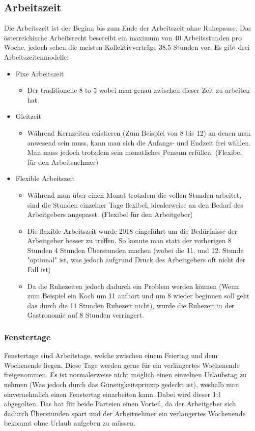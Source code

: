 \documentclass{article}
\begin{document}
	\subsection{Arbeitszeit}
	Die Arbeitszeit ist der Beginn bis zum Ende der Arbeitszeit ohne Ruhepause. Das österreichische Arbeitsrecht bescreibt ein maximum von 40 Arbeitsstunden pro Woche, jedoch sehen die meisten Kollektivverträge 38,5 Stunden vor.
	Es gibt drei Arbeitszeitenmodelle:
	\begin{itemize}
		\item{Fixe Arbeitszeit}
		\begin{itemize}
			\item{Der traditionelle 8 to 5 wobei man genau zwischen dieser Zeit zu arbeiten hat.}
		\end{itemize}
		\item{Gleitzeit}
		\begin{itemize}
			\item{Während Kernzeiten existieren (Zum Beispiel von 8 bis 12) an denen man anwesend sein muss, kann man sich die Anfangs- und Endzeit frei wählen. Man muss jedoch trotzdem sein monatliches Pensum erfüllen. (Flexibel für den Arbeitsnehmer)}
		\end{itemize}
		\item{Flexible Arbeitszeit}
		\begin{itemize}
			\item{Während man über einen Monat trotzdem die vollen Stunden arbeitet, sind die Stunden einzelner Tage flexibel, idealerweise an den Bedarf des Arbeitgebers angepasst. (Flexibel für den Arbeitgeber)}
			\item{Die flexible Arbeitszeit wurde 2018 eingeführt um die Bedürfnisse der Arbeitgeber besser zu treffen. So konnte man statt der vorherigen 8 Stunden 4 Stunden Überstunden machen (wobei die 11. und 12. Stunde "optional" ist, was jedoch aufgrund Druck des Arbeitgebers oft nicht der Fall ist)}
			\item{Da die Ruhezeiten jedoch dadurch ein Problem werden können (Wenn zum Beispiel ein Koch um 11 aufhört und um 8 wieder beginnen soll geht das durch die 11 Stunden Ruhezeit nicht), wurde die Ruhezeit in der Gastronomie auf 8 Stunden verringert.} 
		\end{itemize}
	\end{itemize}
	\subsubsection{Fenstertage}
	Fenstertage sind Arbeitstage, welche zwischen einem Feiertag und dem Wochenende liegen. Diese Tage werden gerne für ein verlängertes Wochenende freigenommen. Es ist normalerweise nicht möglich einen einzelnen Urlaubstag zu nehmen (Was jedoch durch das Günstigkeitsprinzip gedeckt ist), weshalb man einvernehmlich einen Fenstertag einarbeiten kann. Dabei wird dieser 1:1 abgegolten. Das hat für beide Parteien einen Vorteil, da der Arbeitgeber sich dadurch Überstunden spart und der Arbeitnehmer ein verlängertes Wochenende bekommt ohne Urlaub aufgeben zu müssen.
\end{document}
